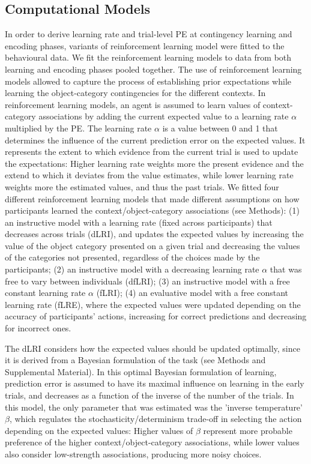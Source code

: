 \documentclass[a4paper,12pt]{article}
\begin{document}
\subsection{Computational Models}
In order to derive learning rate and trial-level PE at contingency learning and encoding phases, variants of reinforcement learning model \citep{Sutton2018a} were fitted to the behavioural data. We fit the reinforcement learning models to data from both learning and encoding phases pooled together. The use of reinforcement learning models allowed to capture the process of establishing prior expectations while learning the object-category contingencies for the different contexts. In reinforcement learning models, an agent is assumed to learn values of context-category associations by adding the current expected value to a learning rate $\alpha$ multiplied by the PE. The learning rate $\alpha$ is a value between 0 and 1 that determines the influence of the current prediction error on the expected values. It represents the extent to which evidence from the current trial is used to update the expectations: Higher learning rate weights more the present evidence and the extend to which it deviates from the value estimates, while lower learning rate weights more the estimated values, and thus the past trials.  We fitted four different reinforcement learning models that made different assumptions on how participants learned the context/object-category associations (see Methods): (1) an instructive model with a learning rate (fixed across participants) that decreases across trials (dLRI), and updates the expected values by increasing the value of the object category presented on a given trial and decreasing the values of the categories not presented, regardless of the choices made by the participants; (2) an instructive model with a decreasing learning rate  $\alpha$ that was free to vary between individuals (dfLRI); (3) an instructive model with a free constant learning rate $\alpha$ (fLRI); (4) an evaluative model with a free constant learning rate (fLRE), where the expected values were updated depending on the accuracy of participants' actions, increasing for correct predictions and decreasing for incorrect ones. \par
The dLRI considers how the expected values should be updated optimally, since it is derived from a Bayesian formulation of the task (see Methods and Supplemental Material). In this optimal Bayesian formulation of learning, prediction error is assumed to have its maximal influence on learning in the early trials, and decreases as a function of the inverse of the number of the trials. In this model, the only parameter that was estimated was the 'inverse temperature' $\beta$, which regulates the stochasticity/determinism trade-off in selecting the action depending on the expected values: Higher values of $\beta$ represent more probable preference of the higher context/object-category associations, while lower values also consider low-strength associations, producing more noisy choices. \par
\end{document}
